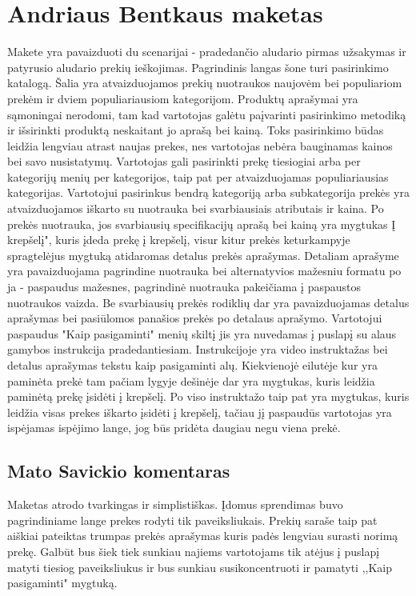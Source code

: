 \documentclass[oneside]{VUMIFPSkursinis}
\begin{document}
\section{Andriaus Bentkaus maketas}
	Makete yra pavaizduoti du scenarijai - pradedančio aludario pirmas užsakymas ir patyrusio aludario prekių ieškojimas.
	Pagrindinis langas šone turi pasirinkimo katalogą.
	Šalia yra atvaizduojamos prekių nuotraukos naujovėm bei populiariom prekėm ir dviem populiariausiom kategorijom.
	Produktų aprašymai yra sąmoningai nerodomi, tam kad vartotojas galėtu paįvarinti pasirinkimo metodiką ir išsirinkti produktą neskaitant jo aprašą bei kainą.
	Toks pasirinkimo būdas leidžia lengviau atrast naujas prekes, nes vartotojas nebėra bauginamas kainos bei savo nusistatymų. \newline
	Vartotojas gali pasirinkti prekę tiesiogiai arba per kategorijų menių per kategorijos, taip pat per atvaizduojamas populiariausias kategorijas.
	Vartotojui pasirinkus bendrą kategoriją arba subkategorija prekės yra atvaizduojamos iškarto su nuotrauka bei svarbiausiais atributais ir kaina.
	Po prekės nuotrauka, jos svarbiausių specifikacijų aprašą bei kainą yra mygtukas Į krepšelį", kuris įdeda prekę į krepšelį, visur kitur prekės keturkampyje spragtelėjus mygtuką atidaromas detalus prekės aprašymas. \newline
	Detaliam aprašyme yra pavaizduojama pagrindine nuotrauka bei alternatyvios mažesniu formatu po ja - paspaudus mažesnes, pagrindinė nuotrauka pakeičiama į paspaustos nuotraukos vaizda.
	Be svarbiausių prekės rodiklių dar yra pavaizduojamas detalus aprašymas bei pasiūlomos panašios prekės po detalaus aprašymo. \newline
	Vartotojui paspaudus "Kaip pasigaminti" menių skiltį jis yra nuvedamas į puslapį su alaus gamybos instrukcija pradedantiesiam.
	Instrukcijoje yra video instruktažas bei detalus aprašymas tekstu kaip pasigaminti alų.
	Kiekvienojė eilutėje kur yra paminėta prekė tam pačiam lygyje dešinėje dar yra mygtukas, kuris leidžia paminėtą prekę įsidėti į krepšelį.
	Po viso instruktažo taip pat yra mygtukas, kuris leidžia visas prekes iškarto įsidėti į krepšelį, tačiau jį paspaudūs vartotojas yra ispėjamas ispėjimo lange, jog būs pridėta daugiau negu viena prekė.

	\subsection{Mato Savickio komentaras}
Maketas atrodo tvarkingas ir simplistiškas. Įdomus sprendimas buvo pagrindiniame lange prekes rodyti tik paveiksliukais. Prekių saraše taip pat aiškiai pateiktas trumpas prekės aprašymas kuris padės lengviau surasti norimą prekę. Galbūt bus šiek tiek sunkiau najiems vartotojams tik atėjus į puslapį matyti tiesiog paveiksliukus ir bus sunkiau susikoncentruoti ir pamatyti ,,Kaip pasigaminti" mygtuką.
\end{document}
